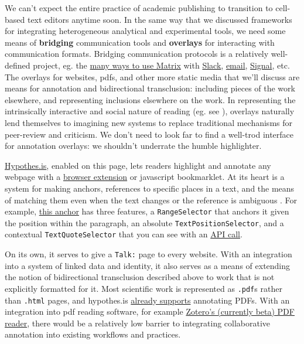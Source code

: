 \documentclass[10pt]{article}
\begin{document}
\begin{multicols}{2}
We can't expect the entire practice of academic publishing to transition
to cell-based text editors anytime soon. In the same way that we
discussed frameworks for integrating heterogeneous analytical and
experimental tools, we need some means of \textbf{bridging}
communication tools and \textbf{overlays} for interacting with
communication formats. Bridging communication protocols is a relatively
well-defined project, eg. the \href{https://matrix.org/bridges/}{many
ways to use Matrix} with
\href{https://matrix.org/bridges/\#slack}{Slack},
\href{https://matrix.org/bridges/\#email}{email},
\href{https://matrix.org/bridges/\#signal}{Signal}, etc. The overlays
for websites, pdfs, and other more static media that we'll discuss are
means for annotation and bidirectional transclusion: including pieces of
the work elsewhere, and representing inclusions elsewhere on the work.
In representing the intrinsically interactive and social nature of
reading (eg. see \cite{jacksonMarginaliaReadersWriting2001} ),
overlays naturally lend themselves to imagining new systems to replace
traditional mechanisms for peer-review and criticism. We don't need to
look far to find a well-trod interface for annotation overlays: we
shouldn't underrate the humble highlighter.

\href{https://hypothes.is}{Hypothes.is}, enabled on this page, lets
readers highlight and annotate any webpage with a
\href{https://chrome.google.com/webstore/detail/hypothesis-web-pdf-annota/bjfhmglciegochdpefhhlphglcehbmek}{browser
extension} or javascript bookmarklet. At its heart is a system for
making anchors, references to specific places in a text, and the means
of matching them even when the text changes or the reference is
ambiguous \cite{csillagFuzzyAnchoring2013} . For example,
\href{https://hypothes.is/a/oLw4uk7_Eeyt5N-FVlE3fw}{this anchor} has
three features, a \texttt{RangeSelector} that anchors it given the
position within the paragraph, an absolute
\texttt{TextPositionSelector}, and a contextual
\texttt{TextQuoteSelector} that you can see with an
\href{https://api.hypothes.is/api/annotations/oLw4uk7_Eeyt5N-FVlE3fw}{API
call}.

On its own, it serves to give a \texttt{Talk:} page to every website.
With an integration into a system of linked data and identity, it also
serves as a means of extending the notion of bidirectional transclusion
described above to work that is not explicitly formatted for it. Most
scientific work is represented as \texttt{.pdf}s rather than
\texttt{.html} pages, and hypothes.is
\href{https://web.hypothes.is/help/annotating-locally-saved-pdfs/}{already
supports} annotating PDFs. With an integration into pdf reading
software, for example
\href{https://www.zotero.org/support/pdf_reader_preview}{Zotero's
(currently beta) PDF reader}, there would be a relatively low barrier to
integrating collaborative annotation into existing workflows and
practices.


\end{multicols}
\end{document}
